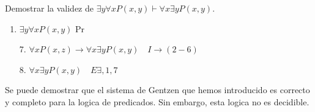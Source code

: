 \begin{example}
	Demostrar la validez de \(\exists  y \forall x P(x,y) \vdash \forall x \exists y P(x,y) \).

	\begin{enumerate}
		\item \(\exists y \forall x P(x,y )\) Pr
	\end{enumerate}
	\begin{enumerate}
		\item[7.] \(\forall x P(x,z) \to \forall x \exists  y P(x,y) \quad I\to(2-6 )\)
		\item[8.] \(\forall x \exists y P(x,y) \quad E \exists ,1,7 \)
	\end{enumerate}
\end{example}

\begin{remark}
	Se puede demostrar que el sistema de Gentzen que hemos introducido es correcto y completo para la logica de predicados. Sin embargo, esta logica no es decidible.
\end{remark}